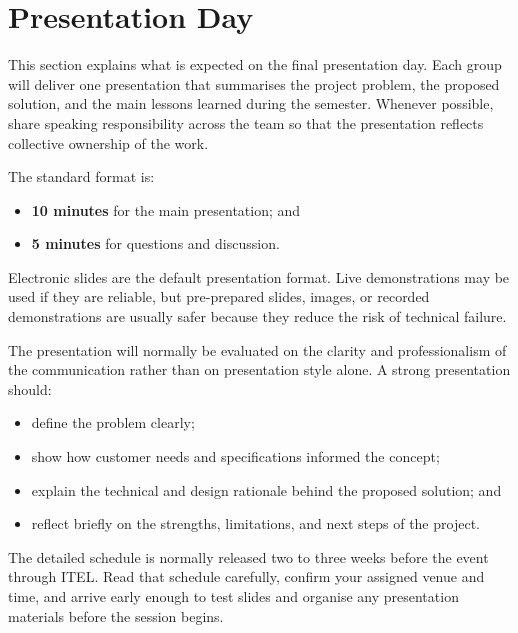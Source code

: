 \section{Presentation Day}

This section explains what is expected on the final presentation day. Each group will deliver one presentation that summarises the project problem, the proposed solution, and the main lessons learned during the semester. Whenever possible, share speaking responsibility across the team so that the presentation reflects collective ownership of the work.

The standard format is:
\begin{itemize}
    \item \textbf{10 minutes} for the main presentation; and
    \item \textbf{5 minutes} for questions and discussion.
\end{itemize}

Electronic slides are the default presentation format. Live demonstrations may be used if they are reliable, but pre-prepared slides, images, or recorded demonstrations are usually safer because they reduce the risk of technical failure.

The presentation will normally be evaluated on the clarity and professionalism of the communication rather than on presentation style alone. A strong presentation should:
\begin{itemize}
    \item define the problem clearly;
    \item show how customer needs and specifications informed the concept;
    \item explain the technical and design rationale behind the proposed solution; and
    \item reflect briefly on the strengths, limitations, and next steps of the project.
\end{itemize}

The detailed schedule is normally released two to three weeks before the event through ITEL. Read that schedule carefully, confirm your assigned venue and time, and arrive early enough to test slides and organise any presentation materials before the session begins.
